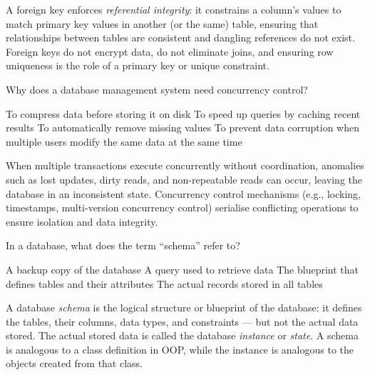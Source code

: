 \documentclass[answers]{exam}
\begin{document}
\begin{questions}
\begin{solution}
    A foreign key enforces \textit{referential integrity}: it constrains a column's values to match primary key values in another (or the same) table, ensuring that relationships between tables are consistent and dangling references do not exist.
    Foreign keys do not encrypt data, do not eliminate joins, and ensuring row uniqueness is the role of a primary key or unique constraint.
\end{solution}

\question Why does a database management system need concurrency control?

\begin{choices}
    \choice To compress data before storing it on disk
    \choice To speed up queries by caching recent results
    \choice To automatically remove missing values
    \correctchoice To prevent data corruption when multiple users modify the same data at the same time
\end{choices}

\begin{solution}
    When multiple transactions execute concurrently without coordination, anomalies such as lost updates, dirty reads, and non-repeatable reads can occur, leaving the database in an inconsistent state.
    Concurrency control mechanisms (e.g., locking, timestamps, multi-version concurrency control) serialise conflicting operations to ensure isolation and data integrity.
\end{solution}

\question In a database, what does the term ``schema'' refer to?

\begin{choices}
    \choice A backup copy of the database
    \choice A query used to retrieve data
    \correctchoice The blueprint that defines tables and their attributes
    \choice The actual records stored in all tables
\end{choices}

\begin{solution}
    A database \textit{schema} is the logical structure or blueprint of the database: it defines the tables, their columns, data types, and constraints --- but not the actual data stored.
    The actual stored data is called the database \textit{instance} or \textit{state}.
    A schema is analogous to a class definition in OOP, while the instance is analogous to the objects created from that class.
\end{solution}


\end{questions}
\end{document}

